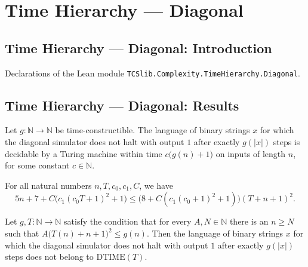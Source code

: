 \section{Time Hierarchy --- Diagonal}
\subsection*{Time Hierarchy --- Diagonal: Introduction}

Declarations of the Lean module \texttt{TCSlib.Complexity.TimeHierarchy.Diagonal}.

\subsection*{Time Hierarchy --- Diagonal: Results}

\begin{definition}
\label{Complexity.TimeHierarchy.diagLang_mem_DTIME}
\leanok
{}
Let $g:\mathbb{N}\to\mathbb{N}$ be time-constructible. The language of binary strings
$x$ for which the diagonal simulator does not halt with output $1$ after exactly
$g(|x|)$ steps is decidable by a Turing machine within time $c\bigl(g(n)+1\bigr)$ on
inputs of length $n$, for some constant $c\in\mathbb{N}$.
\end{definition}

\begin{definition}
\label{Complexity.TimeHierarchy.diag_cost_le}
\leanok
{}
For all natural numbers $n,T,c_0,c_1,C$, we have
\[
5n+7+C\bigl(c_1(c_0T+1)^2+1\bigr) \le \bigl(8+C(c_1(c_0+1)^2+1)\bigr)(T+n+1)^2.
\]
\end{definition}

\begin{theorem}
\label{Complexity.TimeHierarchy.diagLang_not_mem_DTIME}
\leanok
{}
Let $g,T:\mathbb{N}\to\mathbb{N}$ satisfy the condition that for every
$A,N\in\mathbb{N}$ there is an $n\ge N$ such that $A\bigl(T(n)+n+1\bigr)^2\le g(n)$.
Then the language of binary strings $x$ for which the diagonal simulator does not halt
with output $1$ after exactly $g(|x|)$ steps does not belong to $\mathrm{DTIME}(T)$.
\end{theorem}

